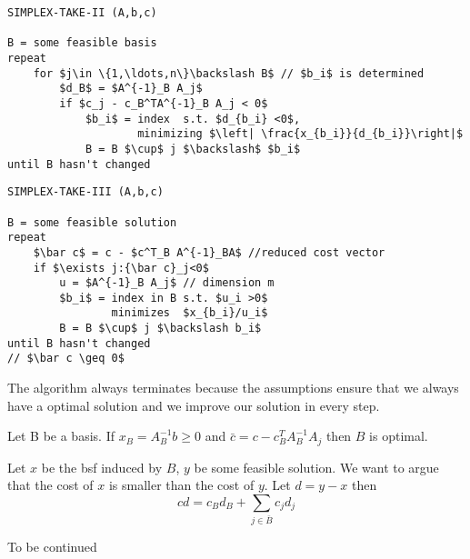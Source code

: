 \begin{lstlisting}
SIMPLEX-TAKE-II (A,b,c)

B = some feasible basis
repeat 
    for $j\in \{1,\ldots,n\}\backslash B$ // $b_i$ is determined
        $d_B$ = $A^{-1}_B A_j$
        if $c_j - c_B^TA^{-1}_B A_j < 0$
            $b_i$ = index  s.t. $d_{b_i} <0$, 
                    minimizing $\left| \frac{x_{b_i}}{d_{b_i}}\right|$
            B = B $\cup$ j $\backslash$ $b_i$
until B hasn't changed
\end{lstlisting}


\begin{lstlisting}
SIMPLEX-TAKE-III (A,b,c)

B = some feasible solution
repeat
    $\bar c$ = c - $c^T_B A^{-1}_BA$ //reduced cost vector
    if $\exists j:{\bar c}_j<0$ 
        u = $A^{-1}_B A_j$ // dimension m
        $b_i$ = index in B s.t. $u_i >0$ 
                minimizes  $x_{b_i}/u_i$
        B = B $\cup$ j $\backslash b_i$ 
until B hasn't changed 
// $\bar c \geq 0$ 
\end{lstlisting}

The algorithm always terminates because the assumptions ensure that we always have a optimal solution and we improve our solution in every step.

\begin{thm}\label{Pr:simplexIIIopt} Let B be a basis. If $x_B=A^{-1}_Bb\geq 0$ and $\bar c=c-c_B^{T}A_B^{-1}A_j$ then $B$ is optimal.\end{thm}

\begin{pr} Let $x$ be the bsf induced by $B$, $y$ be some feasible solution. We want to argue that the cost of $x$ is smaller than the cost of $y$. Let $d=y-x$ then 
\[cd = c_Bd_B + \sum_{j\in \bar B} c_jd_j \] 

To be continued
\end{pr}